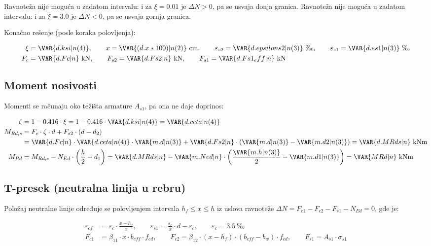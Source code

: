 Ravnoteža nije moguća u zadatom intervalu: i za $\xi = 0.01$ je $\Delta N > 0$, pa se usvaja donja granica.
Ravnoteža nije moguća u zadatom intervalu: i za $\xi = 3.0$ je $\Delta N < 0$, pa se usvaja gornja granica.

Konačno rešenje (posle  koraka polovljenja):

\begin{align*}
\xi &= \VAR{d.ksi|n(4)}, \qquad x = \VAR{(d.x*100)|n(2)} \ \mathrm{cm}, \qquad \varepsilon_{s2} = \VAR{d.epsilons2|n(3)} \ \text{‰}, \qquad \varepsilon_{s1} = \VAR{d.es1|n(3)} \ \text{‰} \\
F_c &= \VAR{d.Fc|n} \ \mathrm{kN}, \qquad F_{s2} = \VAR{d.Fs2|n} \ \mathrm{kN}, \qquad F_{s1} = \VAR{d.Fs1_eff|n} \ \mathrm{kN}
\end{align*}

\subsection{Moment nosivosti}

Momenti se računaju oko težišta armature $A_{s1}$, pa ona ne daje doprinos:

\begin{align*}
\zeta &= 1 - 0.416 \cdot \xi = 1 - 0.416 \cdot \VAR{d.ksi|n(4)} = \VAR{d.ceta|n(4)} \\
M_{Rd,s} &= F_c \cdot \zeta \cdot d + F_{s2} \cdot (d - d_2) \\
&= \VAR{d.Fc|n} \cdot \VAR{d.ceta|n(4)} \cdot \VAR{m.d|n(3)} + \VAR{d.Fs2|n} \cdot (\VAR{m.d|n(3)} - \VAR{m.d2|n(3)}) = \VAR{d.MRds|n} \ \mathrm{kNm} \\
M_{Rd} &= M_{Rd,s} - N_{Ed} \cdot \left(\frac{h}{2} - d_1\right) = \VAR{d.MRds|n} - \VAR{m.Ned|n} \cdot \left(\frac{\VAR{m.h|n(3)}}{2} - \VAR{m.d1|n(3)}\right) = \VAR{MRd|n} \ \mathrm{kNm}
\end{align*}

\subsection{T-presek (neutralna linija u rebru)}

Položaj neutralne linije određuje se polovljenjem intervala $h_f \leq x \leq h$ iz uslova ravnoteže
$\Delta N = F_{c1} - F_{c2} - F_{s1} - N_{Ed} = 0$, gde je:

\begin{align*}
\varepsilon_{cf} &= \varepsilon_c \cdot \frac{x - h_f}{x}, \qquad \varepsilon_{s1} = \frac{\varepsilon_c}{x} \cdot d - \varepsilon_c, \qquad \varepsilon_c = 3.5 \ \text{‰} \\
F_{c1} &= \beta_{11} \cdot x \cdot b_{eff} \cdot f_{cd}, \qquad F_{c2} = \beta_{12} \cdot (x - h_f) \cdot (b_{eff} - b_w) \cdot f_{cd}, \qquad F_{s1} = A_{s1} \cdot \sigma_{s1}
\end{align*}

